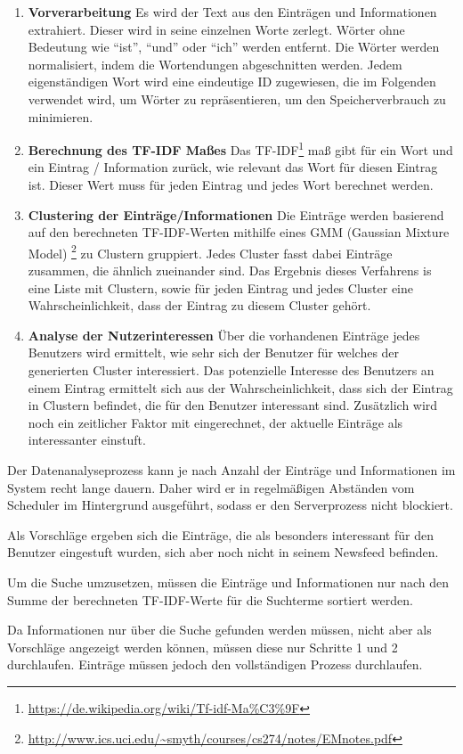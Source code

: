 		\begin{enumerate}
			\item \textbf{Vorverarbeitung} Es wird der Text aus den Einträgen und Informationen extrahiert. Dieser wird in seine einzelnen Worte zerlegt. Wörter ohne Bedeutung wie \enquote{ist}, \enquote{und} oder \enquote{ich} werden entfernt. Die Wörter werden normalisiert, indem die Wortendungen abgeschnitten werden. Jedem eigenständigen Wort wird eine eindeutige ID zugewiesen, die im Folgenden verwendet wird, um Wörter zu repräsentieren, um den Speicherverbrauch zu minimieren.

			\item \textbf{Berechnung des TF-IDF Maßes} Das TF-IDF\footnote{\url{https://de.wikipedia.org/wiki/Tf-idf-Ma\%C3\%9F}} maß gibt für ein Wort und ein Eintrag / Information zurück, wie relevant das Wort für diesen Eintrag ist. Dieser Wert muss für jeden Eintrag und jedes Wort berechnet werden.

			\item \textbf{Clustering der Einträge/Informationen} Die Einträge werden basierend auf den berechneten TF-IDF-Werten mithilfe eines GMM (Gaussian Mixture Model) \footnote{\url{http://www.ics.uci.edu/~smyth/courses/cs274/notes/EMnotes.pdf}} zu Clustern gruppiert. Jedes Cluster fasst dabei Einträge zusammen, die ähnlich zueinander sind. Das Ergebnis dieses Verfahrens is eine Liste mit Clustern, sowie für jeden Eintrag und jedes Cluster eine Wahrscheinlichkeit, dass der Eintrag zu diesem Cluster gehört.

			\item \textbf{Analyse der Nutzerinteressen} Über die vorhandenen Einträge jedes Benutzers wird ermittelt, wie sehr sich der Benutzer für welches der generierten Cluster interessiert. Das potenzielle Interesse des Benutzers an einem Eintrag ermittelt sich aus der Wahrscheinlichkeit, dass sich der Eintrag in Clustern befindet, die für den Benutzer interessant sind. Zusätzlich wird noch ein zeitlicher Faktor mit eingerechnet, der aktuelle Einträge als interessanter einstuft.
		\end{enumerate}

		Der Datenanalyseprozess kann je nach Anzahl der Einträge und Informationen im System recht lange dauern. Daher wird er in regelmäßigen Abständen vom Scheduler im Hintergrund ausgeführt, sodass er den Serverprozess nicht blockiert.

		Als Vorschläge ergeben sich die Einträge, die als besonders interessant für den Benutzer eingestuft wurden, sich aber noch nicht in seinem Newsfeed befinden.

		Um die Suche umzusetzen, müssen die Einträge und Informationen nur nach den Summe der berechneten TF-IDF-Werte für die Suchterme sortiert werden.

		Da Informationen nur über die Suche gefunden werden müssen, nicht aber als Vorschläge angezeigt werden können, müssen diese nur Schritte 1 und 2 durchlaufen. Einträge müssen jedoch den vollständigen Prozess durchlaufen.

